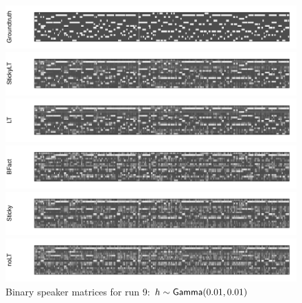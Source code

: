 \begin{figure}[tb]
\begin{center}
  \centerline{\includegraphics[width = \textwidth, height = 0.2\textwidth]{fig/cocktail/synth_s16_m12/hyper_h/h10.0_nocs_cp0/a0p01b0p01/groundtruth.pdf}}
  \centerline{\includegraphics[width = \textwidth, height = 0.2\textwidth]{fig/cocktail/synth_s16_m12/hyper_h/h10.0_nocs_cp0/a0p01b0p01/StickyLT_hdp_hmm_w0_ah0p01_bh0p01/binary_state.pdf}}
  \centerline{\includegraphics[width = \textwidth, height = 0.2\textwidth]{fig/cocktail/synth_s16_m12/hyper_h/h10.0_nocs_cp0/a0p01b0p01/LT_hdp_hmm_w0_ah0p01_bh0p01/binary_state.pdf}}
  \centerline{\includegraphics[width = \textwidth, height = 0.2\textwidth]{fig/cocktail/synth_s16_m12/hyper_h/h10.0_nocs_cp0/a0p01b0p01/BFact_hmm_w0_ah0p01_bh0p01/binary_state.pdf}}
  \centerline{\includegraphics[width = \textwidth, height = 0.2\textwidth]{fig/cocktail/synth_s16_m12/hyper_h/h10.0_nocs_cp0/a0p01b0p01/Sticky_hdp_hmm_w0_ah0p01_bh0p01/binary_state.pdf}}
  \centerline{\includegraphics[width = \textwidth, height = 0.2\textwidth]{fig/cocktail/synth_s16_m12/hyper_h/h10.0_nocs_cp0/a0p01b0p01/noLT_hdp_hmm_w0_ah0p01_bh0p01/binary_state.pdf}}
\caption{Binary speaker matrices for run 9: $h \sim \mathsf{Gamma}(0.01,0.01)$}
\end{center}
\end{figure}


